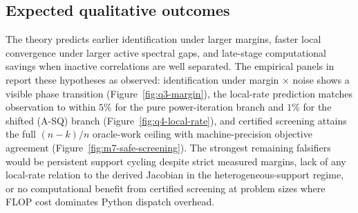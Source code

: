\subsection{Expected qualitative outcomes}
The theory predicts earlier identification under larger margins, faster local convergence under larger active spectral gaps, and late-stage computational savings when inactive correlations are well separated. The empirical panels in  report these hypotheses as observed: identification under margin $\times$ noise shows a visible phase transition (Figure~\ref{fig:q3-margin}), the local-rate prediction matches observation to within $5\%$ for the pure power-iteration branch and $1\%$ for the shifted (A-SQ) branch (Figure~\ref{fig:q4-local-rate}), and certified screening attains the full $(n-k)/n$ oracle-work ceiling with machine-precision objective agreement (Figure~\ref{fig:m7-safe-screening}). The strongest remaining falsifiers would be persistent support cycling despite strict measured margins, lack of any local-rate relation to the derived Jacobian in the heterogeneous-support regime, or no computational benefit from certified screening at problem sizes where FLOP cost dominates Python dispatch overhead.
